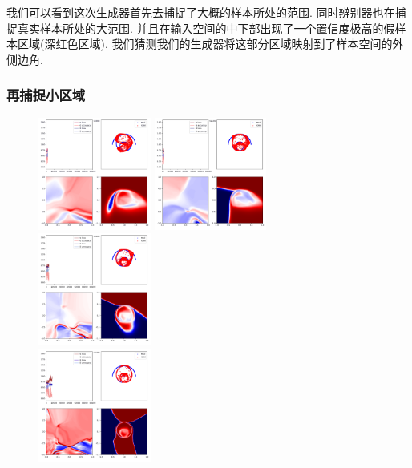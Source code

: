 \documentclass[lang=cn,11pt]{elegantpaper}
\begin{document}
我们可以看到这次生成器首先去捕捉了大概的样本所处的范围. 同时辨别器也在捕捉真实样本所处的大范围. 并且在输入空间的中下部出现了一个置信度极高的假样本区域(深红色区域), 我们猜测我们的生成器将这部分区域映射到了样本空间的外侧边角.

\subsubsection{再捕捉小区域}

\begin{figure}[hbt]
  \includegraphics[width=0.33\textwidth]{wings_3_1}
  \includegraphics[width=0.33\textwidth]{wings_3_2}
  \includegraphics[width=0.33\textwidth]{wings_3_3}\\
  \includegraphics[width=0.33\textwidth]{wings_3_4}

\end{figure}
\end{document}
